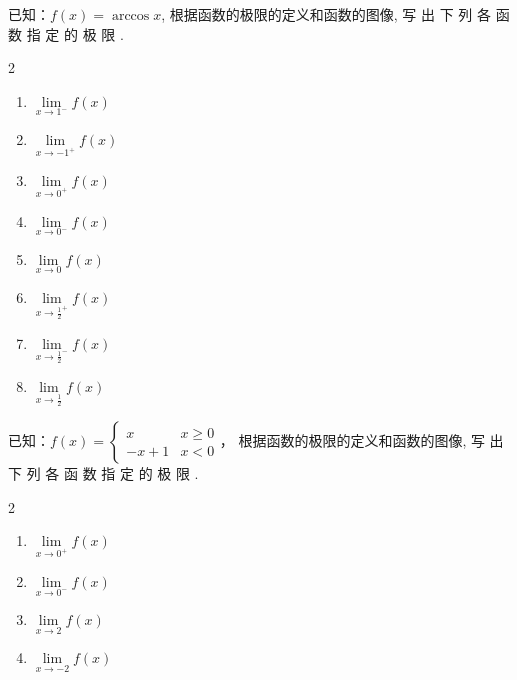 \begin{enumerate}
\noindent
\begin{minipage}{.45\textwidth}
\item 已知：$f(x)=\arccos x$, 根据函数的极限的定义和函数的图像, 写 出 下 列 各 函 数 指 定 的 极 限 . 
\begin{multicols}{2}
\begin{enumerate}[(1)]
    \item $\lim\limits _{x\to 1^- }f( x)$
    \item $\lim\limits _{x\to -1^+ }f( x)$
    \item $\lim\limits _{x\to 0^+ }f( x)$
    \item $\lim\limits _{x\to 0^- }f( x)$
    \item $\lim\limits _{x\to 0 }f( x)$
    \item $\lim\limits _{x\to \tfrac{1}{2}^+ }f( x)$
    \item $\lim\limits _{x\to \tfrac{1}{2}^- }f( x)$
    \item $\lim\limits _{x\to \tfrac{1}{2} }f( x)$
\end{enumerate}
\end{multicols}
\end{minipage}\hfill
\begin{minipage}{.45\textwidth}
\centering
{}    
\end{minipage}

\item 已知：$f(x)=\begin{cases}
    x &x\ge 0\\
-x+1 & x<0
\end{cases}$，
根据函数的极限的定义和函数的图像, 写 出 下 列 各 函 数 指 定 的 极 限 . 
\begin{multicols}{2}
\begin{enumerate}[(1)]
    \item $\lim\limits _{x\to 0^+ }f( x)$
    \item $\lim\limits _{x\to 0^- }f( x)$
    \item $\lim\limits _{x\to 2 }f( x)$
    \item $\lim\limits _{x\to -2 }f( x)$
\end{enumerate}
\end{multicols}
\end{enumerate}

